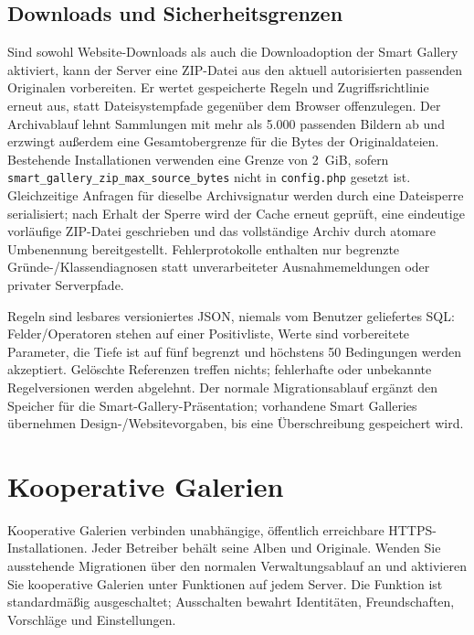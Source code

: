 \documentclass[11pt,a4paper]{article}
\begin{document}
\subsection{Downloads und Sicherheitsgrenzen}

Sind sowohl Website-Downloads als auch die Downloadoption der Smart Gallery
aktiviert, kann der Server eine ZIP-Datei aus den aktuell autorisierten
passenden Originalen vorbereiten. Er wertet gespeicherte Regeln und
Zugriffsrichtlinie erneut aus, statt Dateisystempfade gegenüber dem Browser
offenzulegen. Der Archivablauf lehnt Sammlungen mit mehr als 5.000 passenden
Bildern ab und erzwingt außerdem eine Gesamtobergrenze für die Bytes der
Originaldateien. Bestehende Installationen verwenden eine Grenze von 2~GiB,
sofern \texttt{smart\_gallery\_zip\_max\_source\_bytes} nicht in
\texttt{config.php} gesetzt ist. Gleichzeitige Anfragen für dieselbe
Archivsignatur werden durch eine Dateisperre serialisiert; nach Erhalt der
Sperre wird der Cache erneut geprüft, eine eindeutige vorläufige ZIP-Datei
geschrieben und das vollständige Archiv durch atomare Umbenennung
bereitgestellt. Fehlerprotokolle enthalten nur begrenzte
Gründe-/Klassendiagnosen statt unverarbeiteter Ausnahmemeldungen oder privater
Serverpfade.

Regeln sind lesbares versioniertes JSON, niemals vom Benutzer geliefertes SQL:
Felder/Operatoren stehen auf einer Positivliste, Werte sind vorbereitete
Parameter, die Tiefe ist auf fünf begrenzt und höchstens 50 Bedingungen werden
akzeptiert. Gelöschte Referenzen treffen nichts; fehlerhafte oder unbekannte
Regelversionen werden abgelehnt. Der normale Migrationsablauf ergänzt den
Speicher für die Smart-Gallery-Präsentation; vorhandene Smart Galleries
übernehmen Design-/Websitevorgaben, bis eine Überschreibung gespeichert wird.

\section{Kooperative Galerien}
Kooperative Galerien verbinden unabhängige, öffentlich erreichbare
HTTPS-Installationen. Jeder Betreiber behält seine Alben und Originale. Wenden
Sie ausstehende Migrationen über den normalen Verwaltungsablauf an und
aktivieren Sie kooperative Galerien unter Funktionen auf jedem Server. Die
Funktion ist standardmäßig ausgeschaltet; Ausschalten bewahrt Identitäten,
Freundschaften, Vorschläge und Einstellungen.
\end{document}
